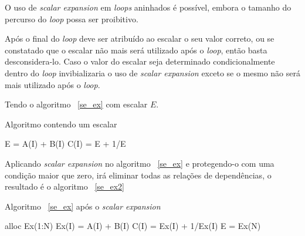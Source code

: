 O uso de \textit{scalar expansion} em \textit{loops} aninhados é possível,
embora o tamanho do percurso do \textit{loop} possa ser proibitivo.

Após o final do \textit{loop} deve ser atribuído ao escalar o seu valor correto,
ou se constatado que o escalar não mais será utilizado após o \textit{loop},
então basta desconsidera-lo.
Caso o valor do escalar seja determinado condicionalmente dentro do
\textit{loop} invibializaria o uso de \textit{scalar expansion} exceto se o
mesmo não será mais utilizado após o \textit{loop}.

Tendo o algoritmo ~\ref{se_ex} com escalar $E$.


\begin{algorithm}
\caption{Algoritmo contendo um escalar}
\label{se_ex}
\begin{algorithmic}[1]

\STATE E = A(I) + B(I)
\STATE C(I) = E + 1/E
\ENDFOR

\end{algorithmic}
\end{algorithm}

Aplicando \textit{scalar expansion} no algoritmo ~\ref{se_ex} e protegendo-o com
uma condição maior que zero, irá eliminar todas as relações de dependências, o
resultado é o algoritmo ~\ref{se_ex2}

\begin{algorithm}
\caption{Algoritmo ~\ref{se_ex} após o \textit{scalar expansion}}
\label{se_ex2}
\begin{algorithmic}[1]

\STATE alloc Ex(1:N)
\STATE Ex(I) = A(I) + B(I)
\STATE C(I) = Ex(I) + 1/Ex(I)
\ENDFOR
\STATE E = Ex(N)
\ENDIF

\end{algorithmic}
\end{algorithm}






